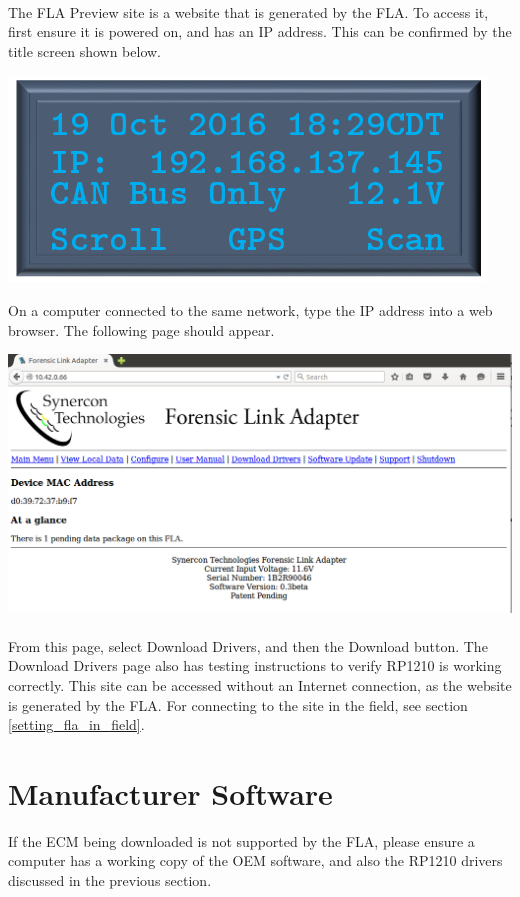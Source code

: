 \documentclass[11pt, oneside]{book}
\begin{document}
\paragraph{  }
The FLA Preview site is a website that is generated by the FLA. To access it, first ensure it is powered on, and has an IP address. This can be confirmed by the title screen shown below.
\begin{center}
\includegraphics[width=0.5\linewidth]{../media/pstricks_files/01_main_screen_can_bus_only}\label{fig:fla_title_screen}
\end{center}
On a computer connected to the same network, type the IP address into a web browser. The following page should appear.
\begin{center}
\includegraphics[width=1\linewidth]{../media/fla_preview_screenshots/main_page}\label{fig:preview_main_page}
\end{center}
\paragraph{  }
From this page, select Download Drivers, and then the Download button. The Download Drivers page also has testing instructions to verify RP1210 is working correctly. This site can be accessed without an Internet connection, as the website is generated by the FLA. For connecting to the site in the field, see section \ref{setting_fla_in_field}.
\section{Manufacturer Software}
If the ECM being downloaded is not supported by the FLA, please ensure a computer has a working copy of the OEM software, and also the RP1210 drivers discussed in the previous section.
\end{document}
